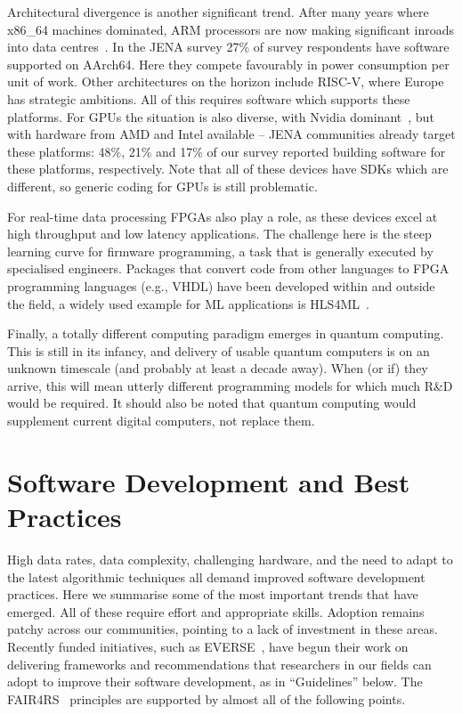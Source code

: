Architectural divergence is another significant trend. After many years where x86\_64 machines dominated, ARM processors are now making significant inroads into data centres~\cite{ARM_Datacentre}. In the JENA survey 27\% of survey respondents have software supported on AArch64. Here they compete favourably in power consumption per unit of work. Other architectures on the horizon include RISC-V, where Europe has strategic ambitions. All of this requires software which supports these platforms. For GPUs the situation is also diverse, with Nvidia dominant~\cite{Datacentre_report}, but with hardware from AMD and Intel available -- JENA communities already target these platforms: 48\%, 21\% and 17\% of our survey reported building software for these platforms, respectively. Note that all of these devices have SDKs which are different, so generic coding for GPUs is still problematic. 

For real-time data processing FPGAs also play a role, as these devices excel at high throughput and low latency applications. The challenge here is the steep learning curve for firmware programming, a task that is generally executed by specialised engineers. Packages that convert code from other languages to FPGA programming languages (e.g., VHDL) have been developed within and outside the field, a widely used example for ML applications is HLS4ML~\cite{Duarte:2018ite}.

Finally, a totally different computing paradigm emerges in quantum computing. This is still in its infancy, and delivery of usable quantum computers is on an unknown timescale (and probably at least a decade away). When (or if) they arrive, this will mean utterly different programming models for which much R\&D would be required. It should also be noted that quantum computing would supplement current digital computers, not replace them.


\section{Software Development and Best Practices}

High data rates, data complexity, challenging hardware, and the need to adapt to the latest algorithmic techniques all demand improved software development practices. Here we summarise some of the most important trends that have emerged. All of these require effort and appropriate skills. Adoption remains patchy across our communities, pointing to a lack of investment in these areas. Recently funded initiatives, such as EVERSE~\cite{EVERSE}, have begun their work on delivering frameworks and recommendations that researchers in our fields can adopt to improve their software development, as in ``Guidelines'' below. The FAIR4RS~\cite{Barker2022} principles are supported by almost all of the following points.

